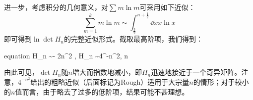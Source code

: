 \documentclass[preview,10pt,border=8pt]{standalone}
\begin{document}
	进一步，考虑积分的几何意义，对$\sum m\ln m$可采用如下近似：
	\begin{equation}
		\sum_{m=1}^k m\ln m
		\sim \int_{\frac{3}{2}}^{n + \frac{1}{2}}
			\dd{x} x\ln x
	\end{equation}
	即可得到$\ln\det H_n$的完整近似形式。截取最高阶项，我们得到：
	\begin{empheq}{equation}
		\ln\det H_n \sim - 2n^2 ,\quad
		\det H_n \sim 4^{-n^2},\quad
		n\to\infty
	\end{empheq}
	
	由此可见，$\det H_n$随$n$增大而指数地减小，即$H_n$迅速地接近于一个奇异矩阵。注意，$4^{-n^2}$给出的粗略近似（后面标记为\textsf{Rough}）适用于大宗量$n$的情形；对于较小的$n$值而言，由于略去了过多的低阶项，结果可能不甚理想。
\end{document}
